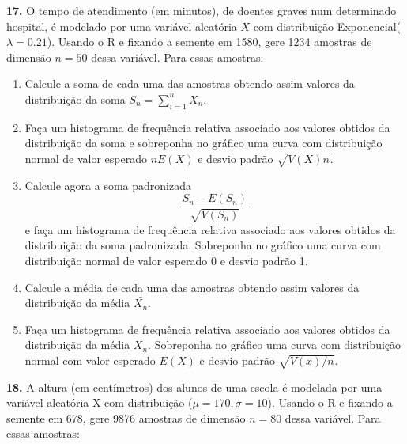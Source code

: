 \documentclass[
]{book}
\begin{document}
\textbf{17.} O tempo de atendimento (em minutos), de doentes graves num
determinado hospital, é modelado por uma variável aleatória \(X\) com
distribuição Exponencial(\(\lambda=0.21\)). Usando o R e fixando a semente
em 1580, gere 1234 amostras de dimensão \(n=50\) dessa variável. Para
essas amostras:

\begin{enumerate}
\def\labelenumi{(\alph{enumi})}
\item
  Calcule a soma de cada uma das amostras obtendo assim valores da
  distribuição da soma \(S_{n} = \sum_{i=1}^{n}X_{n}\).
\item
  Faça um histograma de frequência relativa associado aos valores
  obtidos da distribuição da soma e sobreponha no gráfico uma curva com
  distribuição normal de valor esperado \(nE(X)\) e desvio padrão
  \(\sqrt{V(X)n}\).
\item
  Calcule agora a soma padronizada
  \[\frac{S_{n}-E(S_{n})}{\sqrt{V(S_{n})}}\] e faça um histograma de
  frequência relativa associado aos valores obtidos da distribuição da
  soma padronizada. Sobreponha no gráfico uma curva com distribuição
  normal de valor esperado 0 e desvio padrão 1.
\item
  Calcule a média de cada uma das amostras obtendo assim valores
  da distribuição da média \(\bar{X_{n}}\).
\item
  Faça um histograma de frequência relativa associado aos valores
  obtidos da distribuição da média \(\bar{X_{n}}\). Sobreponha no gráfico
  uma curva com distribuição normal com valor esperado \(E(X)\) e desvio
  padrão \(\sqrt{V(x)/n}\).
\end{enumerate}

\textbf{18.} A altura (em centímetros) dos alunos de uma escola é modelada
por uma variável aleatória X com distribuição
(\(\mu=170, \sigma=10\)). Usando o R e fixando a semente em
678, gere 9876 amostras de dimensão \(n=80\) dessa variável. Para essas
amostras:
\end{document}
